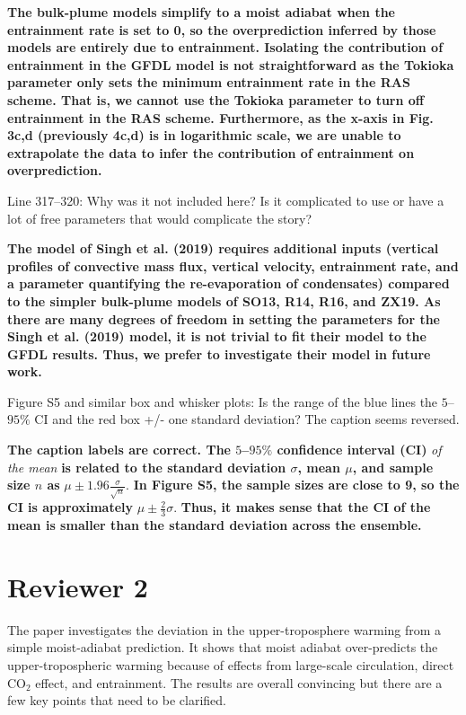 \documentclass[11pt]{article}
\begin{document}
\textbf{The bulk-plume models simplify to a moist adiabat when the entrainment rate is set to 0, so the overprediction inferred by those models are entirely due to entrainment. Isolating the contribution of entrainment in the GFDL model is not straightforward as the Tokioka parameter only sets the minimum entrainment rate in the RAS scheme. That is, we cannot use the Tokioka parameter to turn off entrainment in the RAS scheme. Furthermore, as the x-axis in Fig. 3c,d (previously 4c,d) is in logarithmic scale, we are unable to extrapolate the data to infer the contribution of entrainment on overprediction.}

Line 317--320: Why was it not included here? Is it complicated to use or have a lot of free parameters that would complicate the story?

\textbf{The model of Singh et al. (2019) requires additional inputs (vertical profiles of convective mass flux, vertical velocity, entrainment rate, and a parameter quantifying the re-evaporation of condensates) compared to the simpler bulk-plume models of SO13, R14, R16, and ZX19. As there are many degrees of freedom in setting the parameters for the Singh et al. (2019) model, it is not trivial to fit their model to the GFDL results. Thus, we prefer to investigate their model in future work.}

Figure S5 and similar box and whisker plots: Is the range of the blue lines the \(5\)--\(95\%\) CI and the red box +/- one standard deviation? The caption seems reversed.

\textbf{The caption labels are correct. The \(5\)--\(95\%\) confidence interval (CI)} \emph{of the mean} \textbf{is related to the standard deviation \(\sigma\), mean \(\mu\), and sample size \(n\) as} \(\mu\pm1.96\frac{\sigma}{\sqrt{n}}\). \textbf{In Figure S5, the sample sizes are close to 9, so the CI is approximately} \(\mu\pm\frac{2}{3}\sigma\). \textbf{Thus, it makes sense that the CI of the mean is smaller than the standard deviation across the ensemble.}

\section*{Reviewer 2}
\label{sec:org7fc85c2}

The paper investigates the deviation in the upper-troposphere warming from a simple moist-adiabat prediction. It shows that moist adiabat over-predicts the upper-tropospheric warming because of effects from large-scale circulation, direct CO\(_2\) effect, and entrainment. The results are overall convincing but there are a few key points that need to be clarified.
\end{document}
